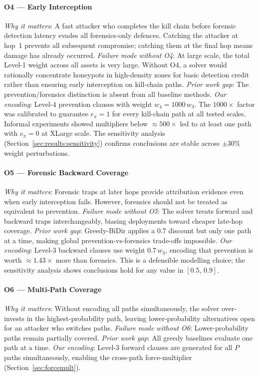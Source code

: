 \documentclass[journal]{IEEEtran}
\begin{document}
\paragraph{O4 --- Early Interception}
\emph{Why it matters}: A fast attacker who completes the kill chain
before forensic detection latency evades all forensics-only defences.
Catching the attacker at hop~1 prevents all subsequent compromise;
catching them at the final hop means damage has already occurred.
\emph{Failure mode without O4}: At large scale, the total Level-1
weight across all assets is very large. Without O4, a solver would
rationally concentrate honeypots in high-density zones for basic
detection credit rather than ensuring early interception on
kill-chain paths.
\emph{Prior work gap}: The prevention/forensics distinction is absent
from all baseline methods.
\emph{Our encoding}: Level-4 prevention clauses with weight $w_4 =
1000\,w_3$. The $1000\times$ factor was calibrated to guarantee
$e_\pi=1$ for every kill-chain path at all tested scales. Informal
experiments showed multipliers below ${\approx}500\times$ led to at
least one path with $e_\pi=0$ at XLarge scale. The sensitivity
analysis (Section~\ref{sec:results:sensitivity}) confirms conclusions
are stable across $\pm30\%$ weight perturbations.

\paragraph{O5 --- Forensic Backward Coverage}
\emph{Why it matters}: Forensic traps at later hops provide attribution
evidence even when early interception fails. However, forensics should
not be treated as equivalent to prevention.
\emph{Failure mode without O5}: The solver treats forward and backward
traps interchangeably, biasing deployments toward cheaper late-hop
coverage.
\emph{Prior work gap}: Greedy-BiDir applies a $0.7$ discount but only
one path at a time, making global prevention-vs-forensics trade-offs
impossible.
\emph{Our encoding}: Level-3 backward clauses use weight $0.7\,w_3$,
encoding that prevention is worth ${\approx}1.43\times$ more than
forensics. This is a defensible modelling choice; the sensitivity
analysis shows conclusions hold for any value in $[0.5,\,0.9]$.

\paragraph{O6 --- Multi-Path Coverage}
\emph{Why it matters}: Without encoding all paths simultaneously, the
solver over-invests in the highest-probability path, leaving
lower-probability alternatives open for an attacker who switches paths.
\emph{Failure mode without O6}: Lower-probability paths remain
partially covered.
\emph{Prior work gap}: All greedy baselines evaluate one path at a
time.
\emph{Our encoding}: Level-3 forward clauses are generated for all
$P$ paths simultaneously, enabling the cross-path force-multiplier
(Section~\ref{sec:forcemult}).
\end{document}
